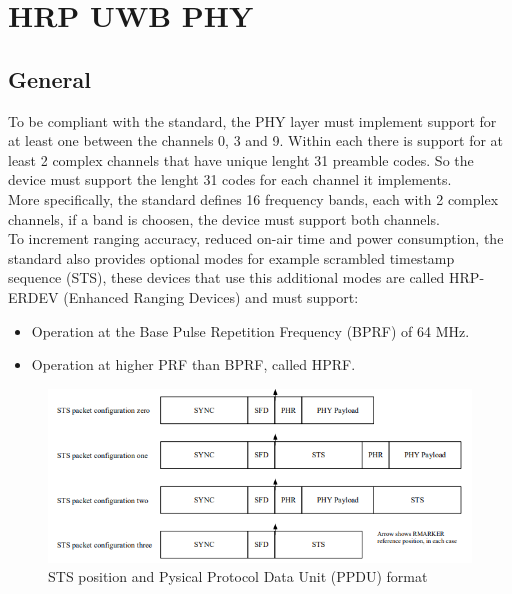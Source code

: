 \documentclass[conference]{IEEEtran}
\begin{document}
\section{HRP UWB PHY}
\subsection{General}
To be compliant with the standard\cite{10794632}, the PHY layer must implement support for at least one
between the channels 0, 3 and 9. Within each there is support for at least 2 complex channels
that have unique lenght 31 preamble codes. So the device must support the lenght 31 codes for
each channel it implements.\\
More specifically, the standard\cite{10794632} defines 16 frequency bands, each with 2 complex channels,
if a band is choosen, the device must support both channels.\\

To increment ranging accuracy, reduced on-air time and power consumption, the standard\cite{10794632}
also provides optional modes for example scrambled timestamp sequence (STS), these devices
that use this additional modes are called HRP-ERDEV (Enhanced Ranging Devices) and must
support:
\begin{itemize}
  \item Operation at the Base Pulse Repetition Frequency (BPRF) of 64 MHz.
  \item Operation at higher PRF than BPRF, called HPRF.
\end{itemize}

\begin{figure}[!h]
  \centering
  \includegraphics[width=\linewidth]{STS-pak}
  \caption{STS position and Pysical Protocol Data Unit (PPDU) format}
  \label{fig:STS}
\end{figure}
\end{document}
